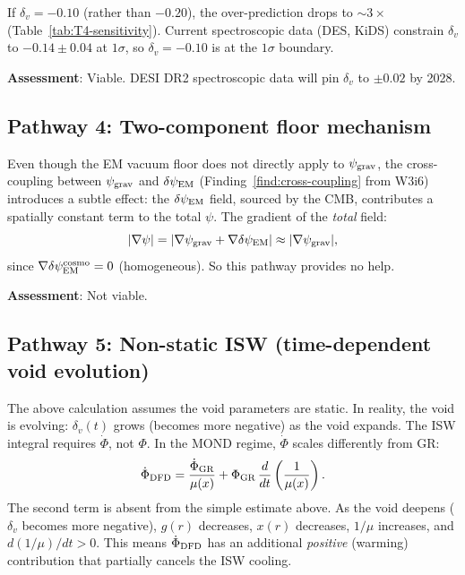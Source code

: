 \documentclass[11pt]{article}
\newcommand{\psigrav}{\psi_{\rm grav}}
\newcommand{\dpsiEM}{\delta\psi_{\rm EM}}
\newcommand{\mufd}{\mu}
\begin{document}
If $\delta_v = -0.10$ (rather than $-0.20$), the over-prediction
drops to $\sim 3\times$ (Table~\ref{tab:T4-sensitivity}). Current
spectroscopic data (DES, KiDS) constrain $\delta_v$ to $-0.14 \pm 0.04$
at $1\sigma$, so $\delta_v = -0.10$ is at the $1\sigma$ boundary.

\textbf{Assessment}: Viable. DESI DR2 spectroscopic data will pin
$\delta_v$ to $\pm 0.02$ by 2028.

\subsection{Pathway 4: Two-component floor mechanism}

Even though the EM vacuum floor does not directly apply to $\psigrav$,
the cross-coupling between $\psigrav$ and $\dpsiEM$
(Finding~\ref{find:cross-coupling} from W3i6) introduces a subtle
effect: the $\dpsiEM$ field, sourced by the CMB, contributes a
spatially constant term to the total $\psi$. The gradient of the
\emph{total} field:
\begin{equation}
|\nabla\psi| = |\nabla\psigrav + \nabla\dpsiEM|
\approx |\nabla\psigrav|,
\end{equation}
since $\nabla\dpsiEM^{\rm cosmo} = 0$ (homogeneous). So this pathway
provides no help.

\textbf{Assessment}: Not viable.

\subsection{Pathway 5: Non-static ISW (time-dependent void evolution)}

The above calculation assumes the void parameters are static. In
reality, the void is evolving: $\delta_v(t)$ grows (becomes more
negative) as the void expands. The ISW integral requires
$\dot{\Phi}$, not $\Phi$. In the MOND regime, $\dot{\Phi}$ scales
differently from GR:
\begin{equation}
\dot{\Phi}_{\rm DFD} = \frac{\dot{\Phi}_{\rm GR}}{\mufd(x)}
+ \Phi_{\rm GR}\,\frac{d}{dt}\left(\frac{1}{\mufd(x)}\right).
\label{eq:Phi-dot-DFD-full}
\end{equation}
The second term is absent from the simple estimate above. As the void
deepens ($\delta_v$ becomes more negative), $g(r)$ decreases,
$x(r)$ decreases, $1/\mufd$ increases, and $d(1/\mufd)/dt > 0$.
This means $\dot{\Phi}_{\rm DFD}$ has an additional \emph{positive}
(warming) contribution that partially cancels the ISW cooling.
\end{document}
